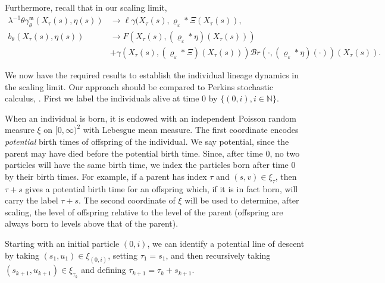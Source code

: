 \documentclass[12pt]{article}
\newcommand{\IN}{\mathbb N}
\begin{document}
Furthermore, recall that in our scaling limit, 
\begin{equation}
\begin{aligned}
\lambda^{-1} \theta \gamma^{\mathfrak{m}}_{\theta}(X_{\tau}(s), \eta(s)) &\to \ell \gamma(X_{\tau}(s),\varrho_\varepsilon*\Xi(X_{\tau}(s)),\\
b_{\theta}(X_{\tau}(s),\eta(s)) &\to  F(X_{\tau}(s), (\varrho_{\varepsilon}*\eta)(X_{\tau}(s)))\\
&+\gamma(X_{\tau}(s), (\varrho_{\varepsilon}*\Xi)(X_{\tau}(s)))\mathcal{B}r(\cdot,(\varrho_{\varepsilon}*\eta)(\cdot))(X_{\tau}(s)).
\end{aligned}    
\end{equation}

We now have the required results to establish the individual lineage dynamics in the scaling limit. Our approach should be compared to Perkins stochastic calculus,
\cite{perkins:1995}. First we label the individuals alive at time $0$
by $\{(0,i), i\in\IN\}$. 

When an individual is born, it is endowed with an
independent Poisson random measure $\xi$ on $[0,\infty)^2$ with Lebesgue
mean measure. The first coordinate encodes {\em potential} birth times of 
offspring of the individual. We say potential, since the parent may have
died before the potential birth time. 
Since, after time $0$, no two particles will have the same birth
time, we index the particles born after time $0$ by 
their birth times.  
For example, if a parent has index $\tau$ and $(s,v)\in \xi_\tau$, then 
$\tau +s$ gives a potential birth time for an offspring which, if
it is in fact born, will carry
the label $\tau+s$. 
The second 
coordinate of $\xi$ will be used to determine, after scaling, 
the level of offspring relative to the 
level of the parent (offspring are always born to levels above that of
the parent). 

Starting with an initial particle 
$(0,i)$, we can identify a potential line of descent by 
taking $(s_1,u_1)\in\xi_{(0,i)}$, setting $\tau_1=s_1$, and then recursively 
taking $(s_{k+1},u_{k+1})\in\xi_{\tau_k}$ and defining $\tau_{k+1}
=\tau_k+s_{k+1}$.
\end{document}
